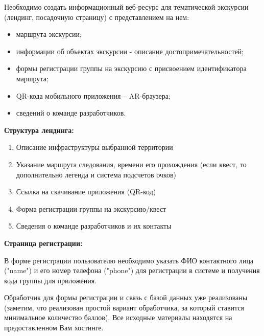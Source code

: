 
Необходимо создать информационный веб-ресурс для тематической экскурсии (лендинг, посадочную страницу) с представлением на нем:

\begin{itemize}
    \item  маршрута экскурсии;
    \item информации об объектах экскурсии - описание достопримечательностей;
    \item формы регистрации группы на экскурсию с присвоением идентификатора маршрута;
    \item QR-кода мобильного приложения – AR-браузера;
    \item сведений о команде разработчиков.
\end{itemize}

\textbf{Структура лендинга:}

\begin{enumerate} 
    \item Описание инфраструктуры выбранной территории
    \item Указание маршрута следования, времени его прохождения (если квест, то дополнительно легенда и система подсчетов очков)
    \item Ссылка на скачивание приложения (QR-код)
    \item Форма регистрации группы на экскурсию/квест
    \item Сведения о команде разработчиков и их контакты
\end{enumerate}

\textbf{Страница регистрации:}

В форме регистрации пользователю необходимо указать ФИО контактного лица ("name") и его номер телефона ("phone") для регистрации в системе и получения кода группы для приложения. 

Обработчик для формы регистрации и связь с базой данных уже реализованы (заметим, что реализован простой вариант обработчика, за который ставится минимальное количество баллов). Все исходные материалы находятся на предоставленном Вам хостинге.

